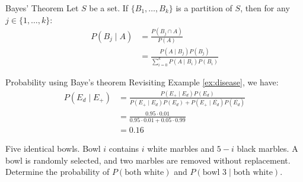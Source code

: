 \begin{thmbox}{Bayes' Theorem}{}
    Let $S$ be a set. If $\{B_1, \ldots, B_k\}$ is a partition of $S$, then for any $j \in \{1, \ldots, k\}$:
    \begin{align*}
        P(B_j \mid A) &= \frac{P(B_j \cap A)}{P(A)} \\
        &= \frac{P(A \mid B_j)P(B_j)}{\sum_{i=0}^{k} P(A \mid B_i) P(B_i) }
    \end{align*}
\end{thmbox}

\begin{exbox}{Probability using Baye's theorem}{}
    Revisiting Example \ref{ex:disease}, we have:
    \begin{align*}
        P(E_d \mid E_+)
        &= \frac{P(E_+ \mid E_d) P(E_d)}{P(E_+ \mid E_d)P(E_d) + P(E_+ \mid \overline{E_d}) P(\overline{E_d})} \\
        &= \frac{0.95 \cdot 0.01}{0.95 \cdot 0.01 + 0.05 \cdot 0.99} \\
        &= 0.16
    \end{align*}
\end{exbox}

\begin{exbox}{}{}
    Five identical bowls. Bowl $i$ contains $i$ white marbles and $5-i$ black marbles. A bowl is randomly selected, and two marbles are removed without replacement. Determine the probability of $P(\text{both white})$ and $P(\text{bowl 3} \mid \text{both white})$.
    \tcblower
\end{exbox}
